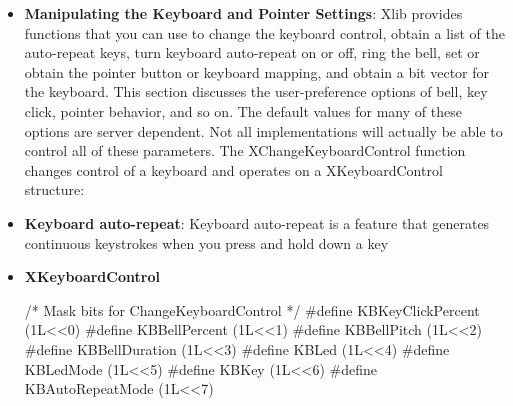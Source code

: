 \documentclass{report}
\begin{document}
\begin{itemize}
\begin{itemize}
                \item revert\_to\_return Returns the current focus state (RevertToParent, RevertToPointerRoot, or RevertToNone).
            \end{itemize}
            The \textbf{XGetInputFocus} function returns the focus window and the current focus state.
        \item \textbf{Manipulating the Keyboard and Pointer Settings}: Xlib provides functions that you can use to change the keyboard control, obtain a list of the auto-repeat keys, turn keyboard auto-repeat on or off, ring the bell, set or obtain the pointer button or keyboard mapping, and obtain a bit vector for the keyboard.
            \bigbreak \noindent 
            This section discusses the user-preference options of bell, key click, pointer behavior, and so on. The default values for many of these options are server dependent. Not all implementations will actually be able to control all of these parameters.
            \bigbreak \noindent 
            The XChangeKeyboardControl function changes control of a keyboard and operates on a XKeyboardControl structure:
        \item \textbf{Keyboard auto-repeat}: Keyboard auto-repeat is a feature that generates continuous keystrokes when you press and hold down a key
        \item \textbf{XKeyboardControl}
            \bigbreak \noindent 
            \begin{cppcode}
            /* Mask bits for ChangeKeyboardControl */
            #define KBKeyClickPercent (1L<<0)
            #define KBBellPercent (1L<<1)
            #define KBBellPitch (1L<<2)
            #define KBBellDuration (1L<<3)
            #define KBLed (1L<<4)
            #define KBLedMode (1L<<5)
            #define KBKey (1L<<6)
            #define KBAutoRepeatMode (1L<<7)


\end{cppcode}
\end{itemize}
\end{document}
